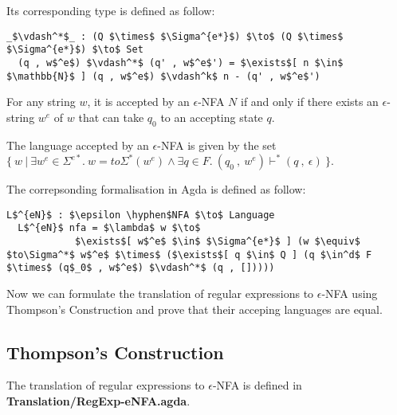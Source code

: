 \par Its corresponding type is defined as follow: 
\begin{lstlisting}[mathescape=true]
  _$\vdash^*$_ : (Q $\times$ $\Sigma^{e*}$) $\to$ (Q $\times$ $\Sigma^{e*}$) $\to$ Set
  (q , w$^e$) $\vdash^*$ (q' , w$^e$') = $\exists$[ n $\in$ $\mathbb{N}$ ] (q , w$^e$) $\vdash^k$ n - (q' , w$^e$')
\end{lstlisting}

\begin{defn}
\noindent For any string \(w\), it is accepted by an \(\epsilon\)-NFA \(N\)
if and only if there exists an \(\epsilon\)-string \(w^e\) of \(w\)
that can take \(q_0\) to an accepting state \(q\). 
\end{defn}

\begin{defn}
\noindent The language accepted by an
\(\epsilon\)-NFA is given by the set \(\{\ w\ |\ \exists w^e\in
\Sigma^{e*}.\ w = to\Sigma^*(w^e) \wedge \exists q\in F.\ (q_0\ ,\
w^e) \vdash^* (q\ ,\ \epsilon)\ \}\). 
\end{defn}

\par The correpsonding formalisation in Agda is defined as follow: 
\begin{lstlisting}[mathescape=true]
  L$^{eN}$ : $\epsilon \hyphen$NFA $\to$ Language
  L$^{eN}$ nfa = $\lambda$ w $\to$ 
            $\exists$[ w$^e$ $\in$ $\Sigma^{e*}$ ] (w $\equiv$ $to\Sigma^*$ w$^e$ $\times$ ($\exists$[ q $\in$ Q ] (q $\in^d$ F $\times$ (q$_0$ , w$^e$) $\vdash^*$ (q , []))))
\end{lstlisting} 

\par Now we can formulate the translation of regular
expressions to \(\epsilon\)-NFA using Thompson's Construction and
prove that their acceping languages are equal. 


\subsection{Thompson's Construction}
\par The translation of regular expressions to \(\epsilon\)-NFA is
defined in \textbf{Translation/RegExp-eNFA.agda}. 

